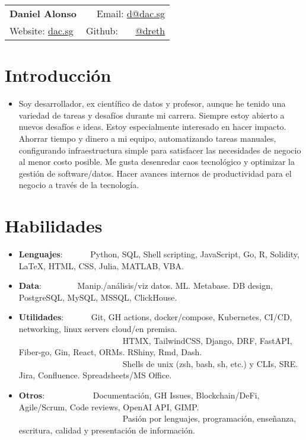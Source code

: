 \documentclass[a4paper,20pt]{article}
\newcommand{\resumeItem}[2]{
  \item\small{
    \textbf{#1}{: #2 \vspace{-2pt}}
  }
}
\newcommand{\resumeSubItem}[2]{\resumeItem{#1}{#2}\vspace{-3pt}}
\newcommand{\resumeSubHeadingListStart}{\begin{itemize}[leftmargin=*]}
\newcommand{\resumeSubHeadingListEnd}{\end{itemize}}
\begin{document}
\begin{tabular*}{\textwidth}{l@{\extracolsep{\fill}}r}
  \textbf{{\LARGE Daniel Alonso}} & Email: {\color{blue}\href{mailto:}{d@dac.sg}}\\
  Website: {\color{blue}\href{https://dac.sg}{dac.sg}} & Github: ~~~{\color{blue}\href{https://github.com/dreth}{@dreth}}
\end{tabular*}




            
\vspace{-3pt}
\section{Introducción}
{\begin{itemize} \itemsep-0.24em
\item {Soy desarrollador, ex científico de datos y profesor, aunque he tenido una variedad de tareas y desafíos durante mi carrera. Siempre estoy abierto a nuevos desafíos e ideas. Estoy especialmente interesado en hacer impacto. Ahorrar tiempo y dinero a mi equipo, automatizando tareas manuales, configurando infraestructura simple para satisfacer las necesidades de negocio al menor costo posible. Me gusta desenredar caos tecnológico y optimizar la gestión de software/datos. Hacer avances internos de productividad para el negocio a través de la tecnología.}
\end{itemize}}
        


            
\vspace{-3pt}
\section{Habilidades}
  \resumeSubHeadingListStart
            
        
\vspace{-1pt}
\resumeSubItem{Lenguajes}{~~~~~~Python, SQL, Shell scripting, JavaScript, Go, R, Solidity, LaTeX, HTML, CSS, Julia, MATLAB, VBA.}
\vspace{-1pt}
\resumeSubItem{Data}{~~~~~~~~Manip./análisis/viz datos. ML. Metabase. DB design, PostgreSQL, MySQL, MSSQL, ClickHouse.}
\vspace{-1pt}
\resumeSubItem{Utilidades}{~~~~~~Git, GH actions, docker/compose, Kubernetes, CI/CD, networking, linux servers cloud/en premisa.\\~~~~~~~~~~~~~~~~~~~~~~~~~HTMX, TailwindCSS, Django, DRF, FastAPI, Fiber-go, Gin, React, ORMs.  RShiny, Rmd, Dash.\\~~~~~~~~~~~~~~~~~~~~~~~~~Shells de unix (zsh, bash, sh, etc.) y CLIs, SRE. Jira, Confluence. Spreadsheets/MS Office.}
\vspace{-1pt}
\resumeSubItem{Otros}{~~~~~~~~~~~Documentación, GH Issues, Blockchain/DeFi, Agile/Scrum, Code reviews, OpenAI API, GIMP.\\~~~~~~~~~~~~~~~~~~~~~~~~~Pasión por lenguajes, programación, enseñanza, escritura, calidad y presentación de información.}
\resumeSubHeadingListEnd
\end{document}

